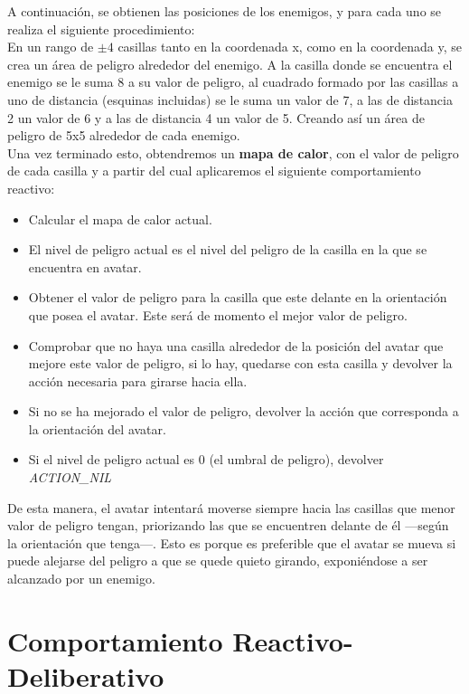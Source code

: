 A continuación, se obtienen las posiciones de los enemigos, y para cada uno se realiza el siguiente procedimiento: \\
En un rango de $\pm 4$ casillas tanto en la coordenada x, como en la coordenada y, se crea un área de peligro alrededor del enemigo. A la casilla donde se encuentra el enemigo se le suma 8 a su valor de peligro, al cuadrado formado por las casillas a uno de distancia (esquinas incluidas) se le suma un valor de 7, a las de distancia 2 un valor de 6 y a las de distancia 4 un valor de 5. Creando así un área de peligro de 5x5 alrededor de cada enemigo.\\

Una vez terminado esto, obtendremos un \textbf{mapa de calor}, con el valor de peligro de cada casilla y a partir del cual aplicaremos el siguiente comportamiento reactivo:
\begin{itemize}
   \item Calcular el mapa de calor actual.
   \item El nivel de peligro actual es el nivel del peligro de la casilla en la que se encuentra en avatar.
   \item Obtener el valor de peligro para la casilla que este delante en la orientación que posea el avatar. Este será de momento el mejor valor de peligro.
   \item Comprobar que no haya una casilla alrededor de la posición del avatar que mejore este valor de peligro, si lo hay, quedarse con esta casilla y devolver la acción necesaria para girarse hacia ella.
   \item Si no se ha mejorado el valor de peligro, devolver la acción que corresponda a la orientación del avatar.
   \item Si el nivel de peligro actual es 0 (el umbral de peligro), devolver \emph{ACTION\_NIL}
\end{itemize}

De esta manera, el avatar intentará moverse siempre hacia las casillas que menor valor de peligro tengan, priorizando las que se encuentren delante de él ---según la orientación que tenga---. Esto es porque es preferible que el avatar se mueva si puede alejarse del peligro a que se quede quieto girando, exponiéndose a ser alcanzado por un enemigo.

\newpage
\chapter{Comportamiento Reactivo-Deliberativo}


